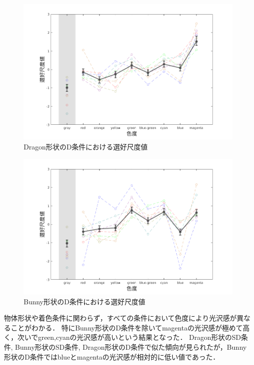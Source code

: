        \begin{figure}[h]
            \centering
            \includegraphics[width=14.0cm]{./img/ex1_res_DD_p.png}
            \caption{Dragon形状のD条件における選好尺度値}
            \label{ex1_DD}
        \end{figure}

        \begin{figure}[h]
            \centering
            \includegraphics[width=14.0cm]{./img/ex1_res_BD_p.png}
            \caption{Bunny形状のD条件における選好尺度値}
            \label{ex1_BD}
        \end{figure}

        物体形状や着色条件に関わらず，すべての条件において色度により光沢感が異なることがわかる．
        特にBunny形状のD条件を除いてmagentaの光沢感が極めて高く，次いでgreen,cyanの光沢感が高いという結果となった．
        Dragon形状のSD条件, Bunny形状のSD条件, Dragon形状のD条件で似た傾向が見られたが，Bunny形状のD条件ではblueとmagentaの光沢感が相対的に低い値であった．

